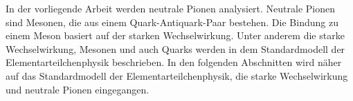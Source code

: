 In der vorliegende Arbeit werden neutrale Pionen analysiert.
Neutrale Pionen sind Mesonen, die aus einem Quark-Antiquark-Paar bestehen.
Die Bindung zu einem Meson basiert auf der starken Wechselwirkung.
Unter anderem die starke Wechselwirkung, Mesonen und auch Quarks werden in dem Standardmodell der Elementarteilchenphysik beschrieben.
In den folgenden Abschnitten wird näher auf das Standardmodell der Elementarteilchenphysik, die starke Wechselwirkung und neutrale Pionen eingegangen.
